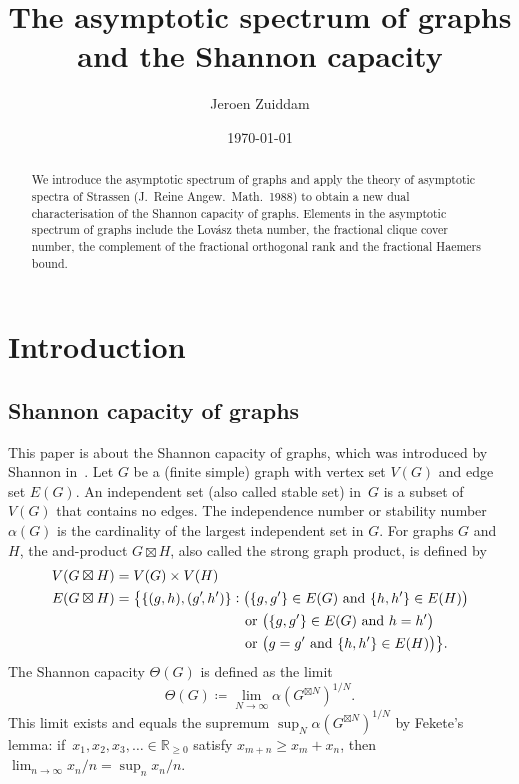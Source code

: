 \documentclass[a4paper, fleqn]{amsart}
\title[The asymptotic spectrum of graphs and the Shannon capacity]{The asymptotic spectrum of graphs\\ and the Shannon capacity}
\author{Jeroen Zuiddam}
\date{\today}
\theoremstyle{plain}
\theoremstyle{definition}
\newcommand{\RR}{\mathbb{R}}
\newcommand{\jeroen}[1]{#1}
\newcommand{\tand}{\textnormal{ and }}
\newcommand{\tor}{\textnormal{ or }}
\begin{document}
\begin{abstract}
We introduce the asymptotic spectrum of graphs and apply the theory of asymptotic spectra of Strassen (J.~Reine Angew.\ Math.\ 1988) to obtain a new dual characterisation of the Shannon capacity of graphs. Elements in the asymptotic spectrum of graphs include the Lovász theta number, the fractional clique cover number, the complement of the fractional orthogonal rank and the fractional Haemers bound.
\end{abstract}

\maketitle

\section{Introduction}\label{intro}

\subsection{Shannon capacity of graphs}
This paper is about the Shannon capacity of graphs, which was introduced by Shannon in~\cite{MR0089131}. %
Let $G$ be a (finite simple) graph with vertex set $V(G)$ and edge set $E(G)$. An independent set \jeroen{(also called stable set)} in~$G$ is a subset of~$V(G)$ that contains no edges. The independence number or stability number $\alpha(G)$ is the cardinality of the largest independent set in $G$. For graphs $G$ and $H$, the and-product $G \boxtimes H$, also called the strong graph product, is defined by
\begin{align*}
V(G \boxtimes H) &= V(G) \times V(H)\\
%
%
E(G \boxtimes H) &= \bigl\{ \{(g,h), (g'\!, h') \} :  \bigl(\{g,g'\} \in E(G) \tand \{h,h'\} \in E(H)\bigr) \\
&\hspace{9em}\tor \bigl(\{g,g'\} \in E(G) \tand h=h'\bigr) \\ 
&\hspace{9em}\tor \bigl(g=g' \tand \{h,h'\} \in E(H) \bigr)\bigr\}.
\end{align*}
The Shannon capacity $\Theta(G)$ is defined as the limit 
%
\[
\Theta(G) \coloneqq \lim_{N \to \infty} \alpha(G^{\boxtimes N})^{1/N}.
\]
%
This limit exists and equals the supremum $\sup_N \alpha(G^{\boxtimes N})^{1/N}$ by Fekete's lemma: if~$x_1, x_2, x_3, \ldots \in \RR_{\geq 0}$ satisfy \jeroen{$x_{m+n} \geq x_m + x_n$, then $\lim_{n\to\infty} x_n/n = \sup_n x_n/n$.}
\end{document}
